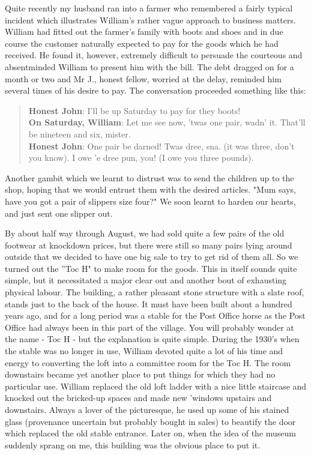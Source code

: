 Quite recently my husband ran into a farmer who remembered a fairly typical incident which illustrates William’s rather vague approach to business matters. William had fitted out the farmer's family with boots and shoes and in due course the customer naturally expected to pay for the goods which he had received. He found it, however, extremely difficult to persuade the courteous and absentminded William to present him with the bill. The debt dragged on for a month or two and Mr J., honest fellow, worried at the delay, reminded him several times of his desire to pay. The conversation proceeded something like this:

\begin{quote}
\textbf{Honest John}: I'll be up Saturday to pay for they boots! \\
\textbf{On Saturday, William}: Let me see now, 'twas one pair, wadn' it. That'll be nineteen and six, mister. \\
\textbf{Honest John}: One pair be darned! Twas dree, sna. (it was three, don’t you know). I owe 'e dree pun, you! (I owe you three pounds).
\end{quote}

Another gambit which we learnt to distrust was to send the children up to the shop, hoping that we would entrust them with the desired articles. "Mum says, have you got a pair of slippers size four?" We soon learnt to harden our hearts, and just sent one slipper out.

By about half way through August, we had sold quite a few pairs of the old footwear at knockdown prices, but there were still so many pairs lying around outside that we decided to have one big sale to try to get rid of them all. So we turned out the ”Toc H" to make room for the goods. This in itself sounds quite simple, but it necessitated a major clear out and another bout of exhausting physical labour. The building, a rather pleasant stone structure with a slate roof, stands just to the back of the house. It must have been built about a hundred years ago, and for a long period was a stable for the Post Office horse as the Post Office had always been in this part of the village. You will probably wonder at the name - Toc H - but the explanation is quite simple. During the 1930's when the stable was no longer in use, William devoted quite a lot of his time and energy to converting the loft into a committee room for the Toc H. The room downstairs became yet another place to put things for which they had no particular use. William replaced the old loft ladder with a nice little staircase and knocked out the bricked-up spaces and made new 'windows upstairs and downstairs. Always a lover of the picturesque, he used up some of his stained glass (provenance uncertain but probably bought in sales) to beautify the door which replaced the old stable entrance. Later on, when the idea of the museum suddenly sprang on me, this building was the obvious place to put it.

